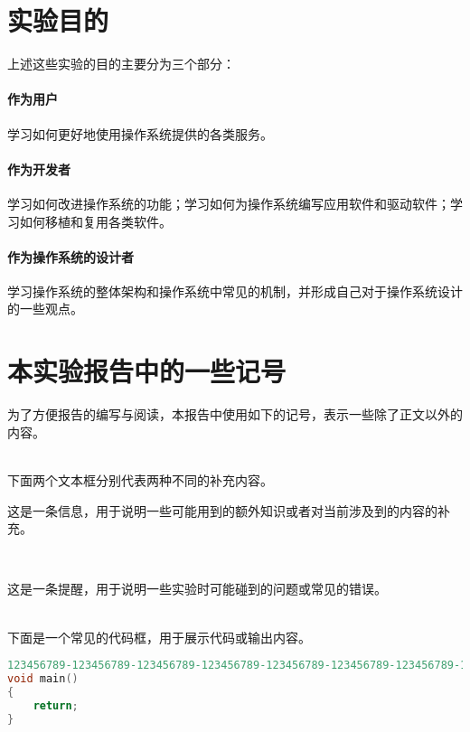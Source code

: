 \section{实验目的}

上述这些实验的目的主要分为三个部分：

\paragraph*{作为用户} 学习如何更好地使用操作系统提供的各类服务。

\paragraph*{作为开发者} 学习如何改进操作系统的功能；学习如何为操作系统编写应用软件和驱动软件；学习如何移植和复用各类软件。

\paragraph*{作为操作系统的设计者} 学习操作系统的整体架构和操作系统中常见的机制，并形成自己对于操作系统设计的一些观点。

\section{本实验报告中的一些记号}

为了方便报告的编写与阅读，本报告中使用如下的记号，表示一些除了正文以外的内容。

~\\

下面两个文本框分别代表两种不同的补充内容。
\begin{proposition}[这是一条信息]
    这是一条信息，用于说明一些可能用到的额外知识或者对当前涉及到的内容的补充。
\end{proposition}
~\\
\begin{theorem}[这是一条提醒] 
    这是一条提醒，用于说明一些实验时可能碰到的问题或常见的错误。
\end{theorem}

~\\

下面是一个常见的代码框，用于展示代码或输出内容。
\begin{lstlisting}[language=C]
123456789-123456789-123456789-123456789-123456789-123456789-123456789-12345678
void main()
{
    return;
}
\end{lstlisting}
